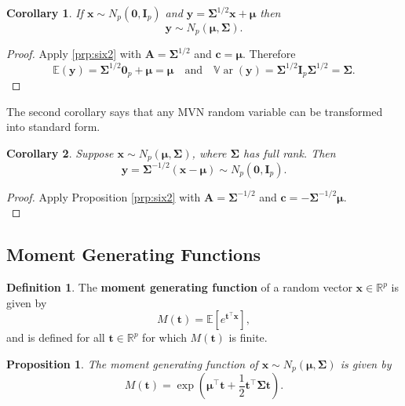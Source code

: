 \documentclass[]{book}
\newtheorem{corollary}{Corollary}[chapter]
\newtheorem{proposition}{Proposition}[chapter]
\theoremstyle{definition}
\newtheorem{definition}{Definition}[chapter]
\theoremstyle{definition}
\theoremstyle{definition}
\theoremstyle{remark}
\begin{document}
\begin{corollary}
\protect\hypertarget{cor:csix2}{}{\label{cor:csix2} } If \(\boldsymbol x\sim N_p(\boldsymbol 0,\mathbf I_p)\) and \(\boldsymbol y= \boldsymbol \Sigma^{1/2} \boldsymbol x+ \boldsymbol \mu\) then \[\boldsymbol y\sim N_p(\boldsymbol \mu,\boldsymbol \Sigma).\]
\end{corollary}

\begin{proof}
{}Apply \ref{prp:six2} with \(\boldsymbol A= \boldsymbol \Sigma^{1/2}\) and \(\boldsymbol c= \boldsymbol \mu\). Therefore
\[{\mathbb{E}}(\boldsymbol y) = \boldsymbol \Sigma^{1/2} \boldsymbol 0_p + \boldsymbol \mu= \boldsymbol \mu\quad \mbox{and}\quad {\mathbb{V}\operatorname{ar}}(\boldsymbol y) = \boldsymbol \Sigma^{1/2} \mathbf I_p \boldsymbol \Sigma^{1/2} = \boldsymbol \Sigma.\]
\end{proof}

The second corollary says that any MVN random variable can be transformed into standard form.

\begin{corollary}
\protect\hypertarget{cor:csix3}{}{\label{cor:csix3} }Suppose \(\boldsymbol x\sim N_p(\boldsymbol \mu,\boldsymbol \Sigma)\), where \(\boldsymbol \Sigma\) has full rank. Then\\
\[\boldsymbol y= \boldsymbol \Sigma^{-1/2}(\boldsymbol x- \boldsymbol \mu) \sim N_p(\boldsymbol 0,\mathbf I_p).\]
\end{corollary}

\begin{proof}
{}Apply Proposition \ref{prp:six2} with \(\boldsymbol A= \boldsymbol \Sigma^{-1/2}\) and \(\boldsymbol c= - \boldsymbol \Sigma^{-1/2} \boldsymbol \mu\).\\
\end{proof}

\hypertarget{moment-generating-functions}{%
\subsection{Moment Generating Functions}\label{moment-generating-functions}}

\begin{definition}
\protect\hypertarget{def:mgf}{}{\label{def:mgf} }The \textbf{moment generating function} of a random vector \(\boldsymbol x\in \mathbb{R}^p\) is given by
\[
M({\boldsymbol t})={\mathbb{E}}[e^{{\boldsymbol t}^\top \boldsymbol x}],
\]
and is defined for all \({\boldsymbol t}\in \mathbb{R}^p\) for which \(M({\boldsymbol t})\) is finite.
\end{definition}
\begin{proposition}
\protect\hypertarget{prp:six3}{}{\label{prp:six3} } The moment generating function of \(\boldsymbol x\sim N_p(\boldsymbol \mu, \boldsymbol \Sigma)\) is given by
\begin{equation}
M({\boldsymbol t})=\exp \left (\boldsymbol \mu^\top  {\boldsymbol t}+ \frac{1}{2} {\boldsymbol t}^\top \boldsymbol \Sigma{\boldsymbol t}\right).
\label{eq:Mt}
\end{equation}
\end{proposition}
\end{document}
